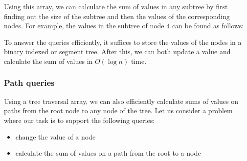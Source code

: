 Using this array, we can calculate the sum of values
in any subtree by first finding out the size of the subtree
and then the values of the corresponding nodes.
For example, the values in the subtree of node $4$
can be found as follows:

\begin{center}
\end{center}

To answer the queries efficiently,
it suffices to store the values of the
nodes in a binary indexed or segment tree.
After this, we can both update a value
and calculate the sum of values in $O(\log n)$ time.

\subsubsection{Path queries}

Using a tree traversal array, we can also efficiently
calculate sums of values on
paths from the root node to any
node of the tree.
Let us consider a problem where our task
is to support the following queries:
\begin{itemize}
\item change the value of a node
\item calculate the sum of values on a path from
the root to a node
\end{itemize}

